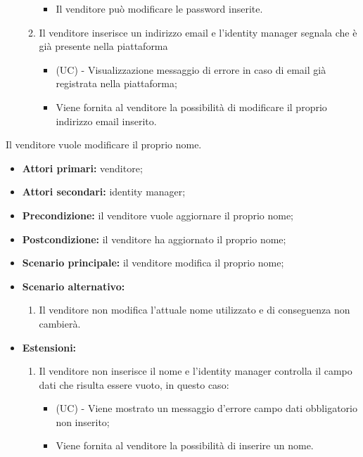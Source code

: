\begin{itemize}
\begin{enumerate}[label=\lett]
\begin{itemize}
    		\item Il venditore può modificare le password inserite.
    	\end{itemize}
    	\item Il venditore inserisce un indirizzo email e l'identity manager segnala che è già presente nella piattaforma
    	\begin{itemize}
    		\item (UC) - Visualizzazione messaggio di errore in caso di email già registrata nella piattaforma;
    		\item Viene fornita al venditore la possibilità di modificare il proprio indirizzo email inserito.
    	\end{itemize}
    \end{enumerate}
\end{itemize}
\resetSubUC

Il venditore vuole modificare il proprio nome.
\begin{itemize}
	\item \textbf{Attori primari:} venditore;
	\item \textbf{Attori secondari:} identity manager;
	\item \textbf{Precondizione:} il venditore vuole aggiornare il proprio nome;
	\item \textbf{Postcondizione:} il venditore ha aggiornato il proprio nome;
	\item \textbf{Scenario principale:} il venditore modifica il proprio nome;
	\item \textbf{Scenario alternativo:}
	\begin{enumerate}[label=\lett]
		\item Il venditore non modifica l'attuale nome utilizzato e di conseguenza non cambierà.
	\end{enumerate}
	\item \textbf{Estensioni:}
	\begin{enumerate}[label=\lett]
		\item Il venditore non inserisce il nome e l'identity manager controlla il campo dati che risulta essere vuoto, in questo caso:
		\begin{itemize}
			\item (UC) - Viene mostrato un messaggio d'errore campo dati obbligatorio non inserito;
			\item Viene fornita al venditore la possibilità di inserire un nome.
		\end{itemize}
	\end{enumerate} 
\end{itemize}

